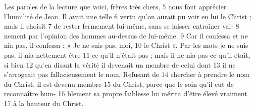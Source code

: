 Les paroles de la lecture que voici, frères très chers,	 
5	 	nous font apprécier l'humilité de Jean. Il avait une telle	 
6	 	vertu qu'on aurait pu voir en lui le Christ ; mais il choisit	 
7	 	de rester fermement lui-même, sans se laisser entraîner vai-	 
8	 	nement par l'opinion des hommes au-dessus de lui-même.	 
9	 	Car il confessa et ne nia pas, il confessa : « Je ne suis pas, moi,	 
10	 	le Christ ». Par les mots je ne suis pas, il nia nettement être	 
11	 	ce qu'il n'était pas ; mais il ne nia pas ce qu'il était, si bien	 
12	 	qu'en disant la vérité il devenait un membre de celui dont	 
13	 	il ne s'arrogeait pas fallacieusement le nom. Refusant de	 
14	 	chercher à prendre le nom du Christ, il est devenu membre	 
15	 	du Christ, parce que le soin qu'il eut de reconnaître hum-	 
16	 	blement sa propre faiblesse lui mérita d'être élevé vraiment	 
17	 	à la hauteur du Christ.